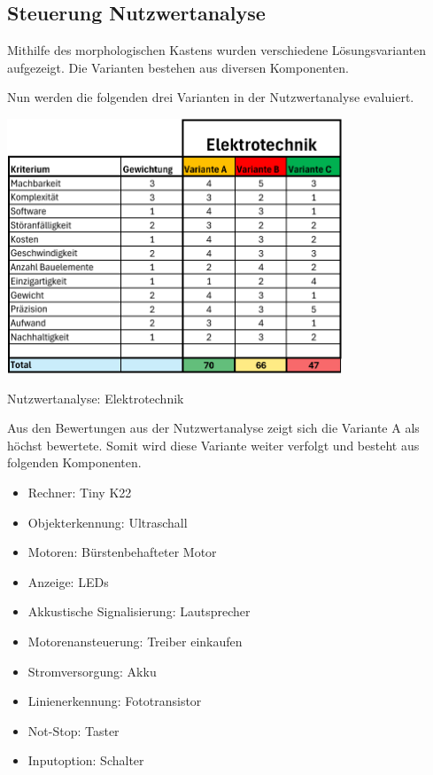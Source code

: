 \subsection{Steuerung Nutzwertanalyse}

Mithilfe des morphologischen Kastens wurden verschiedene Lösungsvarianten aufgezeigt. Die Varianten bestehen aus diversen Komponenten. 


Nun werden die folgenden drei Varianten in der Nutzwertanalyse evaluiert.




\begin{table}[H]
\centering
\includegraphics[width=0.75\textwidth]{assets/Nutzwertanalyse-ET.pdf}
\caption{Nutzwertanalyse: Elektrotechnik}
\label{table:nutzwert-ET}
\end{table}

Aus den Bewertungen aus der Nutzwertanalyse zeigt sich die Variante A als höchst bewertete. Somit wird diese Variante weiter verfolgt und besteht aus folgenden Komponenten.

\begin{itemize}
    \item Rechner: Tiny K22
    \item Objekterkennung: Ultraschall
    \item Motoren: Bürstenbehafteter Motor
    \item Anzeige: LEDs 
    \item Akkustische Signalisierung: Lautsprecher
    \item Motorenansteuerung: Treiber einkaufen
    \item Stromversorgung: Akku
    \item Linienerkennung: Fototransistor
    \item Not-Stop: Taster
    \item Inputoption: Schalter
\end{itemize}

